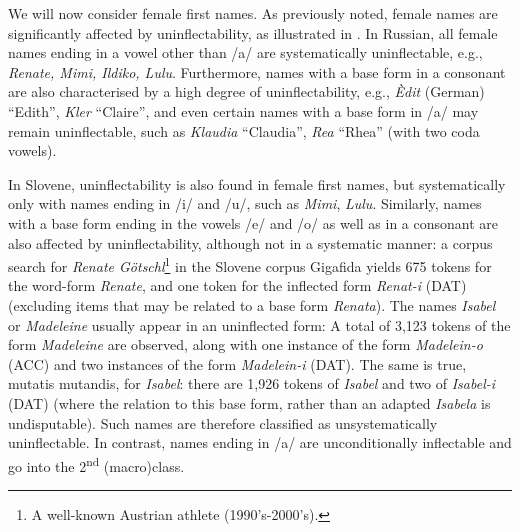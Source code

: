 \documentclass[output=paper]{langscibook}
\begin{document}
We will now consider female first names. As previously noted, female names are significantly affected by uninflectability, as illustrated in . In Russian, all female names ending in a vowel other than /a/ are systematically uninflectable, e.g., \textit{Renate, Mimi, Ildiko, Lulu}. Furthermore, names with a base form in a consonant are also characterised by a high degree of uninflectability, e.g., \textit{Èdit} (German) “Edith”, \textit{Kler} “Claire”, and even certain names with a base form in /a/ may remain uninflectable, such as \textit{Klaudia} “Claudia”, \textit{Rea} “Rhea” (with two coda vowels).

In Slovene, uninflectability is also found in female first names, but systematically only with names ending in /i/ and /u/, such as \textit{Mimi}, \textit{Lulu}. Similarly, names with a base form ending in the vowels /e/ and /o/ as well as in a consonant are also affected by uninflectability, although not in a systematic manner: a corpus search for \textit{Renate Götschl}\footnote{ \textrm{A well-known Austrian athlete (1990’s-2000’s).}} in the Slovene corpus Gigafida yields 675 tokens for the word-form \textit{Renate}, and one token for the inflected form \textit{Renat-i} (DAT) (excluding items that may be related to a base form \textit{Renata}). The names \textit{Isabel} or \textit{Madeleine} usually appear in an uninflected form: A total of 3,123 tokens of the form \textit{Madeleine} are observed, along with one instance of the form \textit{Madelein-o} (ACC) and two instances of the form \textit{Madelein-i} (DAT). The same is true, mutatis mutandis, for \textit{Isabel}: there are 1,926 tokens of \textit{Isabel} and two of \textit{Isabel-i} (DAT) (where the relation to this base form, rather than an adapted \textit{Isabela} is undisputable). Such names are therefore classified as unsystematically uninflectable. In contrast, names ending in /a/ are unconditionally inflectable and go into the 2\textsuperscript{nd} (macro)class.
\end{document}
